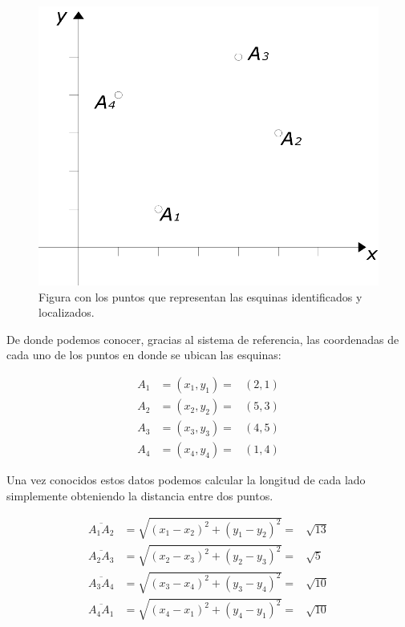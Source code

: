 \begin{figure}
 \centering
 \includegraphics[]{Img/cuadrilatero_diagrama}
 \caption[Cuadrilátero localizado en el espacio]{ 
 Figura con los puntos que representan las esquinas identificados y localizados.
 } \label{cuadrilateroDiagrama:fig}
\end{figure}

De donde podemos conocer, gracias al sistema de referencia, las coordenadas de cada uno de los puntos en donde se ubican las esquinas:

\begin{eqnarray}
A_1 & =  (x_1, y_1)  = & (2,1) \nonumber \\
A_2 & =  (x_2, y_2)  = & (5,3) \nonumber \\
A_3 & =  (x_3, y_3)  = & (4,5) \nonumber \\
A_4 & =  (x_4, y_4)  = & (1,4) \nonumber
\end{eqnarray}

Una vez conocidos estos datos podemos calcular la longitud de cada lado simplemente obteniendo la distancia entre dos puntos.

\begin{eqnarray}
\overline{A_1 A_2} & =  \sqrt{(x_1 - x_2)^2 + (y_1 - y_2)^2}  = & \sqrt{13}  \nonumber \\
\overline{A_2 A_3} & =  \sqrt{(x_2 - x_3)^2 + (y_2 - y_3)^2}  = & \sqrt{5}   \nonumber \\
\overline{A_3 A_4} & =  \sqrt{(x_3 - x_4)^2 + (y_3 - y_4)^2}  = & \sqrt{10}  \nonumber \\
\overline{A_4 A_1} & =  \sqrt{(x_4 - x_1)^2 + (y_4 - y_1)^2}  = & \sqrt{10}  \nonumber
\end{eqnarray}

